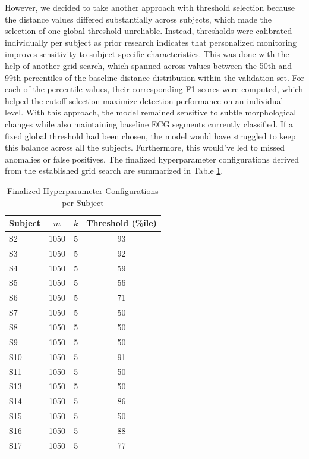 \documentclass[conference,10pt]{IEEEtran}
\begin{document}
However, we decided to take another approach with threshold selection because the distance values differed substantially across subjects, which made the selection of one global threshold unreliable. Instead, thresholds were calibrated individually per subject as prior research indicates that personalized monitoring improves sensitivity to subject-specific characteristics\cite{r24}.
This was done with the help of another grid search, which spanned across values between the 50th and 99th percentiles of the baseline distance distribution within the validation set. For each of the percentile values, their corresponding F1-scores were computed, which helped the cutoff selection maximize detection performance on an individual level. 
With this approach, the model remained sensitive to subtle morphological changes while also maintaining baseline ECG segments currently classified. If a fixed global threshold had been chosen, the model would have struggled to keep this balance across all the subjects. Furthermore, this would've led to missed anomalies or false positives.
The finalized hyperparameter configurations derived from the established grid search are summarized in Table \ref{tab:parameter_summary}. 

\begin{table}[htbp]
\centering
\scriptsize
\renewcommand{\arraystretch}{0.85}
\caption{Finalized Hyperparameter Configurations per Subject}
\label{tab:parameter_summary}
\begin{tabular}{lccc}
\hline
\textbf{Subject} & \textbf{$m$} & \textbf{$k$} & \textbf{Threshold (\%ile)} \\
\hline
S2  & 1050 & 5 & 93 \\
S3  & 1050 & 5 & 92 \\
S4  & 1050 & 5 & 59 \\
S5  & 1050 & 5 & 56 \\
S6  & 1050 & 5 & 71 \\
S7  & 1050 & 5 & 50 \\
S8  & 1050 & 5 & 50 \\
S9  & 1050 & 5 & 50 \\
S10 & 1050 & 5 & 91 \\
S11 & 1050 & 5 & 50 \\
S13 & 1050 & 5 & 50 \\
S14 & 1050 & 5 & 86 \\
S15 & 1050 & 5 & 50 \\
S16 & 1050 & 5 & 88 \\
S17 & 1050 & 5 & 77 \\
\hline
\end{tabular}
\end{table}
\end{document}
